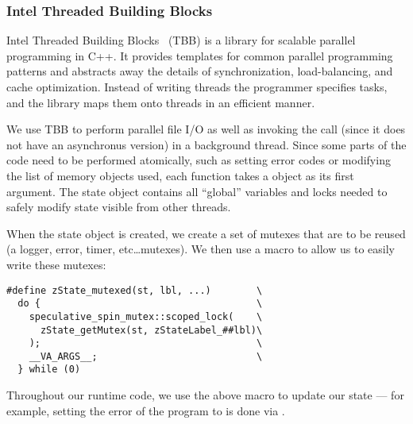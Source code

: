
\subsubsection{Intel Threaded Building Blocks}
Intel Threaded Building Blocks~\cite{reinders2007intel} (TBB) is a library for
scalable parallel
programming in C++. It provides templates for common parallel programming
patterns and abstracts away the details of synchronization, load-balancing,
and cache optimization. Instead of writing threads the programmer specifies
tasks, and the library maps them onto threads in an efficient manner.

We use TBB to perform parallel file I/O as well as invoking the
	 call (since it does not have an asynchronus version)
	in a background thread.
Since some parts of the code need to be performed atomically, such as
	setting error codes or modifying the list of memory objects used,
	each function takes a  object as its first argument.
The state object contains all ``global'' variables and locks needed to
	safely modify state visible from other threads.


When the state object is created, we create a set of mutexes that
	are to be reused (a logger, error, timer, etc\ldots mutexes).
We then use a macro to allow us to easily write these mutexes:

\begin{verbatim}
#define zState_mutexed(st, lbl, ...)        \
  do {                                      \
    speculative_spin_mutex::scoped_lock(    \
      zState_getMutex(st, zStateLabel_##lbl)\
    );                                      \
    __VA_ARGS__;                            \
  } while (0)
\end{verbatim}


Throughout our runtime code, we use the above macro to update our state ---
 	for example, setting the error of the program to  is done via .


